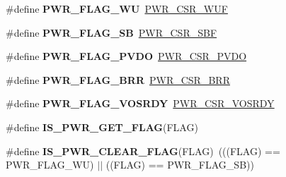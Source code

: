 \begin{DoxyCompactItemize}
\item 
\hypertarget{group___p_w_r___flag_ga2d06760a5769e729b06d41e37036d58e}{}\#define {\bfseries P\+W\+R\+\_\+\+F\+L\+A\+G\+\_\+\+W\+U}~\hyperlink{group___peripheral___registers___bits___definition_ga9465bb7ad9ca936688344e2a077539e6}{P\+W\+R\+\_\+\+C\+S\+R\+\_\+\+W\+U\+F}\label{group___p_w_r___flag_ga2d06760a5769e729b06d41e37036d58e}

\item 
\hypertarget{group___p_w_r___flag_ga9e55f0b5dec2346d5c8dee3ab3c0c2df}{}\#define {\bfseries P\+W\+R\+\_\+\+F\+L\+A\+G\+\_\+\+S\+B}~\hyperlink{group___peripheral___registers___bits___definition_gab4fd42f153660593cad6f4fe22ff76bb}{P\+W\+R\+\_\+\+C\+S\+R\+\_\+\+S\+B\+F}\label{group___p_w_r___flag_ga9e55f0b5dec2346d5c8dee3ab3c0c2df}

\item 
\hypertarget{group___p_w_r___flag_gaefd05d58cc050eeef83a1b5c520b2c2a}{}\#define {\bfseries P\+W\+R\+\_\+\+F\+L\+A\+G\+\_\+\+P\+V\+D\+O}~\hyperlink{group___peripheral___registers___bits___definition_ga3535ce181895cc00afeb28dcac68d04c}{P\+W\+R\+\_\+\+C\+S\+R\+\_\+\+P\+V\+D\+O}\label{group___p_w_r___flag_gaefd05d58cc050eeef83a1b5c520b2c2a}

\item 
\hypertarget{group___p_w_r___flag_ga4d4937c0a493bc2ff70e7e66c301c191}{}\#define {\bfseries P\+W\+R\+\_\+\+F\+L\+A\+G\+\_\+\+B\+R\+R}~\hyperlink{group___peripheral___registers___bits___definition_ga939410de980c5bc297ff04bcf30875cc}{P\+W\+R\+\_\+\+C\+S\+R\+\_\+\+B\+R\+R}\label{group___p_w_r___flag_ga4d4937c0a493bc2ff70e7e66c301c191}

\item 
\hypertarget{group___p_w_r___flag_ga7c0f807d7e91750a9bb571ca94dc5f71}{}\#define {\bfseries P\+W\+R\+\_\+\+F\+L\+A\+G\+\_\+\+V\+O\+S\+R\+D\+Y}~\hyperlink{group___peripheral___registers___bits___definition_ga4126ed19cce54a5411ff8dd440171695}{P\+W\+R\+\_\+\+C\+S\+R\+\_\+\+V\+O\+S\+R\+D\+Y}\label{group___p_w_r___flag_ga7c0f807d7e91750a9bb571ca94dc5f71}

\item 
\#define {\bfseries I\+S\+\_\+\+P\+W\+R\+\_\+\+G\+E\+T\+\_\+\+F\+L\+A\+G}(F\+L\+A\+G)
\item 
\hypertarget{group___p_w_r___flag_ga36d35a770e683e4a0baf3aac350fcb5a}{}\#define {\bfseries I\+S\+\_\+\+P\+W\+R\+\_\+\+C\+L\+E\+A\+R\+\_\+\+F\+L\+A\+G}(F\+L\+A\+G)~(((F\+L\+A\+G) == P\+W\+R\+\_\+\+F\+L\+A\+G\+\_\+\+W\+U) $\vert$$\vert$ ((F\+L\+A\+G) == P\+W\+R\+\_\+\+F\+L\+A\+G\+\_\+\+S\+B))\label{group___p_w_r___flag_ga36d35a770e683e4a0baf3aac350fcb5a}

\end{DoxyCompactItemize}


